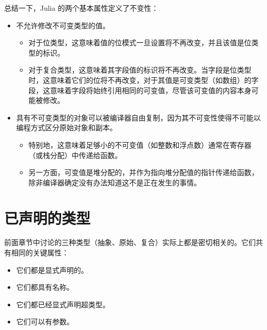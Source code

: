 总结一下，Julia 的两个基本属性定义了不变性：



\begin{itemize}
\item 不允许修改不可变类型的值。

\begin{itemize}
\item 对于位类型，这意味着值的位模式一旦设置将不再改变，并且该值是位类型的标识。


\item 对于复合类型，这意味着其字段值的标识将不再改变。当字段是位类型时，这意味着它们的位将不再改变，对于其值是可变类型（如数组）的字段，这意味着字段将始终引用相同的可变值，尽管该可变值的内容本身可能被修改。

\end{itemize}

\item 具有不可变类型的对象可以被编译器自由复制，因为其不可变性使得不可能以编程方式区分原始对象和副本。

\begin{itemize}
\item 特别地，这意味着足够小的不可变值（如整数和浮点数）通常在寄存器（或栈分配）中传递给函数。


\item 另一方面，可变值是堆分配的，并作为指向堆分配值的指针传递给函数，除非编译器确定没有办法知道这不是正在发生的事情。

\end{itemize}
\end{itemize}


\hypertarget{11930598139930328403}{}


\section{已声明的类型}



前面章节中讨论的三种类型（抽象、原始、复合）实际上都是密切相关的。它们共有相同的关键属性：



\begin{itemize}
\item 它们都是显式声明的。


\item 它们都具有名称。


\item 它们都已经显式声明超类型。


\item 它们可以有参数。

\end{itemize}


